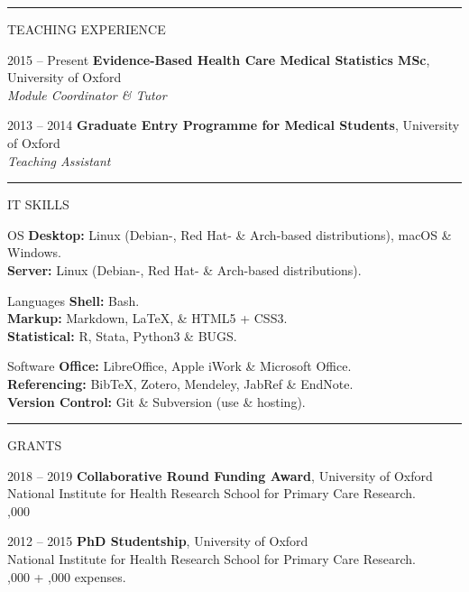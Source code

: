 \documentclass[10pt,a4paper]{article}
\begin{document}
\noindent\rule{\textwidth}{0.4pt}
\begin{cvlist}{TEACHING EXPERIENCE}
  
  \item[2015 -- Present]
  \textbf{Evidence-Based Health Care Medical Statistics MSc}, University of Oxford \\
  \textit{Module Coordinator \& Tutor}
  
  \item[2013 -- 2014]
  \textbf{Graduate Entry Programme for Medical Students}, University of Oxford \\
  \textit{Teaching Assistant}
  
\end{cvlist}


\noindent\rule{\textwidth}{0.4pt}
\begin{cvlist}{IT SKILLS}

  \item[OS]
  \textbf{Desktop:} Linux (Debian-, Red Hat- \& Arch-based distributions), macOS \& Windows. \\
  \textbf{Server:} Linux (Debian-, Red Hat- \& Arch-based distributions).
  
  \item[Languages]
  \textbf{Shell:} Bash. \\
  \textbf{Markup:} Markdown, \LaTeX , \& HTML5 + CSS3. \\
  \textbf{Statistical:} R, Stata, Python3 \& BUGS.
  
  \item[Software]
  \textbf{Office:} LibreOffice, Apple iWork \& Microsoft Office. \\
  \textbf{Referencing:} BibTeX, Zotero, Mendeley, JabRef \& EndNote. \\
  \textbf{Version Control:} Git \& Subversion (use \& hosting).
  
\end{cvlist}


\noindent\rule{\textwidth}{0.4pt}
\begin{cvlist}{GRANTS}
  
  \item[2018 -- 2019]
  \textbf{Collaborative Round Funding Award}, University of Oxford \\
  National Institute for Health Research School for Primary Care Research. \\
  ,000
  
  \item[2012 -- 2015]
  \textbf{PhD Studentship}, University of Oxford \\
  National Institute for Health Research School for Primary Care Research. \\
  ,000 + ,000 expenses.
  
\end{cvlist}
\end{document}
